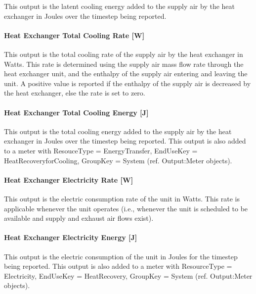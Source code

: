 This output is the latent cooling energy added to the supply air by the heat exchanger in Joules over the timestep being reported.

\paragraph{Heat Exchanger Total Cooling Rate {[}W{]}}\label{heat-exchanger-total-cooling-rate-w-1}

This output is the total cooling rate of the supply air by the heat exchanger in Watts. This rate is determined using the supply air mass flow rate through the heat exchanger unit, and the enthalpy of the supply air entering and leaving the unit. A positive value is reported if the enthalpy of the supply air is decreased by the heat exchanger, else the rate is set to zero.

\paragraph{Heat Exchanger Total Cooling Energy {[}J{]}}\label{heat-exchanger-total-cooling-energy-j-1}

This output is the total cooling energy added to the supply air by the heat exchanger in Joules over the timestep being reported. This output is also added to a meter with ResouceType = EnergyTransfer, EndUseKey = HeatRecoveryforCooling, GroupKey = System (ref. Output:Meter objects).

\paragraph{Heat Exchanger Electricity Rate {[}W{]}}\label{heat-exchanger-electric-power-w-1}

This output is the electric consumption rate of the unit in Watts. This rate is applicable whenever the unit operates (i.e., whenever the unit is scheduled to be available and supply and exhaust air flows exist).

\paragraph{Heat Exchanger Electricity Energy {[}J{]}}\label{heat-exchanger-electric-energy-j-1}

This output is the electric consumption of the unit in Joules for the timestep being reported. This output is also added to a meter with ResourceType = Electricity, EndUseKey = HeatRecovery, GroupKey = System (ref. Output:Meter objects).

